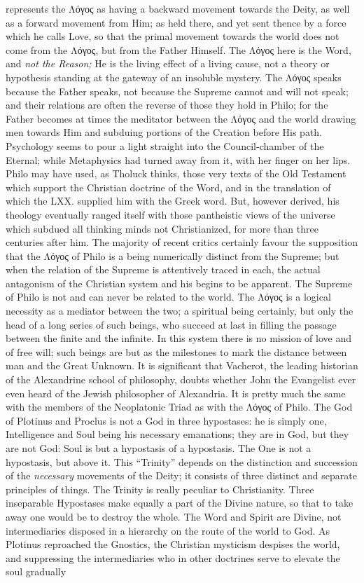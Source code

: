 represents the \textgreek{Λόγος} as having a backward movement towards the Deity, as well as a forward movement from Him; as held there, and yet sent thence by a force which he calls Love, so that the primal movement towards the world does not come from the \textgreek{Λόγος}, but from the Father Himself. The \textgreek{Λόγος} here is the Word, and \emph{not the Reason;} He is the living effect of a living cause, not a theory or hypothesis standing at the gateway of an insoluble mystery. The \textgreek{Λόγος} speaks because the Father speaks, not because the Supreme cannot and will not speak; and their relations are often the reverse of those they hold in Philo; for the Father becomes at times the meditator between the \textgreek{Λόγος} and the world drawing men towards Him and subduing portions of the Creation before His path. Psychology seems to pour a light straight into the Council-chamber of the Eternal; while Metaphysics had turned away from it, with her finger on her lips. Philo may have used, as Tholuck thinks, those very texts of the Old Testament which support the Christian doctrine of the Word, and in the translation of which the LXX. supplied him with the Greek word. But, however derived, his theology eventually ranged itself with those pantheistic views of the universe which subdued all thinking minds not Christianized, for more than three centuries after him. The majority of recent critics certainly favour the supposition that the \textgreek{Λόγος} of Philo is a being numerically distinct from the Supreme; but when the relation of the Supreme is attentively traced in each, the actual antagonism of the Christian system and his begins to be apparent. The Supreme of Philo is not and can never be related to the world. The \textgreek{Λόγος} is a logical necessity as a mediator between the two; a spiritual being certainly, but only the head of a long series of such beings, who succeed at last in filling the passage between the finite and the infinite. In this system there is no mission of love and of free will; such beings are but as the milestones to mark the distance between man and the Great Unknown. It is significant that Vacherot, the leading historian of the Alexandrine school of philosophy, doubts whether John the Evangelist ever even heard of the Jewish philosopher of Alexandria. It is pretty much the same with the members of the Neoplatonic Triad as with the \textgreek{Λόγος} of Philo. The God of Plotinus and Proclus is not a God in three hypostases: he is simply one, Intelligence and Soul being his necessary emanations; they are in God, but they are not God: Soul is but a hypostasis of a hypostasis. The One is not a hypostasis, but above it. This “Trinity” depends on the distinction and succession of the \emph{necessary} movements of the Deity; it consists of three distinct and separate principles of things. The Trinity is really peculiar to Christianity. Three inseparable Hypostases make equally a part of the Divine nature, so that to take away one would be to destroy the whole. The Word and Spirit are Divine, not intermediaries disposed in a hierarchy on the route of the world to God. As Plotinus reproached the Gnostics, the Christian mysticism despises the world, and suppressing the intermediaries who in other doctrines serve to elevate the soul gradually 